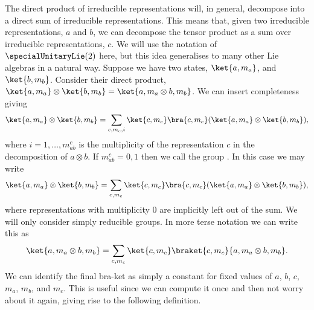 \documentclass[fleqn]{NotesClass}
\newcommand*{\directproduct}{\otimes}
\begin{document}
    The direct product of irreducible representations will, in general, decompose into a direct sum of irreducible representations.
    This means that, given two irreducible representations, \(a\) and \(b\), we can decompose the tensor product as a sum over irreducible representations, \(c\).
    We will use the notation of \(\specialUnitaryLie(2)\) here, but this idea generalises to many other Lie algebras in a natural way.
    Suppose we have two states, \(\ket{a, m_a}\), and \(\ket{b, m_b}\).
    Consider their direct product, \(\ket{a, m_a} \directproduct \ket{b, m_b} = \ket{a, m_a \directproduct b, m_b}\).
    We can insert completeness giving
    \begin{align}
        \ket{a, m_a} \directproduct \ket{b, m_b} = \sum_{c, m_c, i} \ket{c, m_c}\bra{c, m_c}(\ket{a, m_a} \directproduct \ket{b, m_b}),
    \end{align}
    where \(i = 1, \dotsc, m_{ab}^c\) is the multiplicity of the representation \(c\) in the decomposition of \(a \directproduct b\).
    If \(m_{ab}^c = 0, 1\) then we call the group .
    In this case we may write
    \begin{equation}
        \ket{a, m_a} \directproduct \ket{b, m_b} = \sum_{c, m_c} \ket{c, m_c} \bra{c, m_c}(\ket{a, m_a} \directproduct \ket{b, m_b}),
    \end{equation}
    where representations with multiplicity 0 are implicitly left out of the sum.
    We will only consider simply reducible groups.
    In more terse notation we can write this as
    \begin{equation}
        \ket{a, m_a \directproduct b, m_b} = \sum_{c, m_c} \ket{c, m_c} \braket{c, m_c}{a, m_a \directproduct b, m_b}.
    \end{equation}
    We can identify the final bra-ket as simply a constant for fixed values of \(a\), \(b\), \(c\), \(m_a\), \(m_b\), and \(m_c\).
    This is useful since we can compute it once and then not worry about it again, giving rise to the following definition.
    
\end{document}
